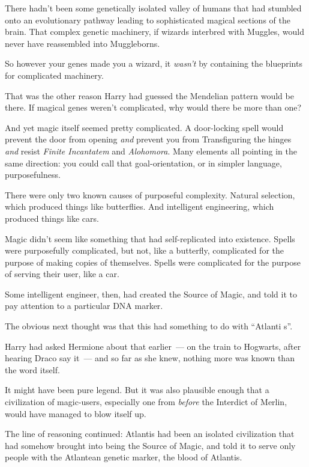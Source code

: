 There hadn't been some genetically isolated valley of humans that had stumbled onto an evolutionary pathway leading to sophisticated magical sections of the brain. That complex genetic machinery, if wizards interbred with Muggles, would never have reassembled into Muggleborns.

So however your genes made you a wizard, it \emph{wasn't} by containing the blueprints for complicated machinery.

That was the other reason Harry had guessed the Mendelian pattern would be there. If magical genes weren't complicated, why would there be more than one?

And yet magic itself seemed pretty complicated. A door-locking spell would prevent the door from opening \emph{and} prevent you from Transfiguring the hinges \emph{and} resist \emph{Finite Incantatem} and \emph{Alohomora}. Many elements all pointing in the same direction: you could call that goal-orientation, or in simpler language, purposefulness.

There were only two known causes of purposeful complexity. Natural selection, which produced things like butterflies. And intelligent engineering, which produced things like cars.

Magic didn't seem like something that had self-replicated into existence. Spells were purposefully complicated, but not, like a butterfly, complicated for the purpose of making copies of themselves. Spells were complicated for the purpose of serving their user, like a car.

Some intelligent engineer, then, had created the Source of Magic, and told it to pay attention to a particular DNA marker.

The obvious next thought was that this had something to do with ``Atlanti s''.

Harry had asked Hermione about that earlier~--- on the train to Hogwarts, after hearing Draco say it~--- and so far as she knew, nothing more was known than the word itself.

It might have been pure legend. But it was also plausible enough that a civilization of magic-users, especially one from \emph{before} the Interdict of Merlin, would have managed to blow itself up.

The line of reasoning continued: Atlantis had been an isolated civilization that had somehow brought into being the Source of Magic, and told it to serve only people with the Atlantean genetic marker, the blood of Atlantis.

